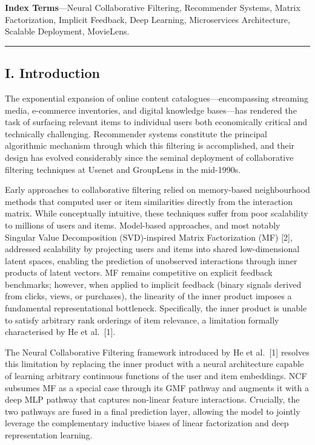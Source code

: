 \documentclass[
]{IEEEtran}
\begin{document}
\textbf{Index Terms}---Neural Collaborative Filtering, Recommender
Systems, Matrix Factorization, Implicit Feedback, Deep Learning,
Microservices Architecture, Scalable Deployment, MovieLens.

\begin{center}\rule{0.5\linewidth}{0.5pt}\end{center}

\subsection{I. Introduction}\label{i.-introduction}

The exponential expansion of online content catalogues---encompassing
streaming media, e-commerce inventories, and digital knowledge
bases---has rendered the task of surfacing relevant items to individual
users both economically critical and technically challenging.
Recommender systems constitute the principal algorithmic mechanism
through which this filtering is accomplished, and their design has
evolved considerably since the seminal deployment of collaborative
filtering techniques at Usenet and GroupLens in the mid-1990s.

Early approaches to collaborative filtering relied on memory-based
neighbourhood methods that computed user or item similarities directly
from the interaction matrix. While conceptually intuitive, these
techniques suffer from poor scalability to millions of users and items.
Model-based approaches, and most notably Singular Value Decomposition
(SVD)-inspired Matrix Factorization (MF) {[}2{]}, addressed scalability
by projecting users and items into shared low-dimensional latent spaces,
enabling the prediction of unobserved interactions through inner
products of latent vectors. MF remains competitive on explicit feedback
benchmarks; however, when applied to implicit feedback (binary signals
derived from clicks, views, or purchases), the linearity of the inner
product imposes a fundamental representational bottleneck. Specifically,
the inner product is unable to satisfy arbitrary rank orderings of item
relevance, a limitation formally characterised by He et al.~{[}1{]}.

The Neural Collaborative Filtering framework introduced by He et
al.~{[}1{]} resolves this limitation by replacing the inner product with
a neural architecture capable of learning arbitrary continuous functions
of the user and item embeddings. NCF subsumes MF as a special case
through its GMF pathway and augments it with a deep MLP pathway that
captures non-linear feature interactions. Crucially, the two pathways
are fused in a final prediction layer, allowing the model to jointly
leverage the complementary inductive biases of linear factorization and
deep representation learning.
\end{document}
